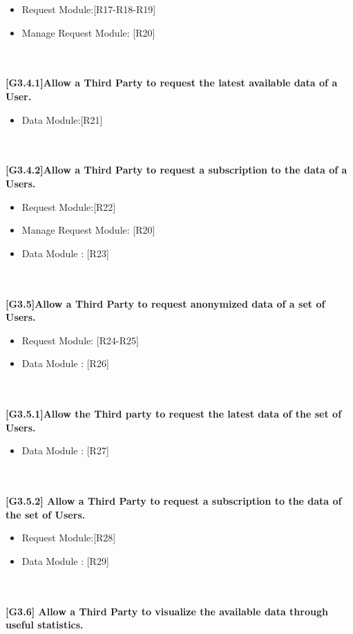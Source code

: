 \begin{itemize}
\item Request Module:[R17-R18-R19]
    \item  Manage Request Module: [R20]
\end{itemize} \\ \\
\textbf{[G3.4.1]Allow a Third Party to request the latest available data of a User.}
\begin{itemize}
\item Data Module:[R21]
   
    \end{itemize} \\ \\
    \textbf{[G3.4.2]Allow a Third Party to request a subscription to the data of a
Users.}
\begin{itemize}
\item Request Module:[R22]
    \item  Manage Request Module: [R20]
    \item Data Module : [R23]
\end{itemize} \\ \\
\textbf{[G3.5]Allow a Third Party to request anonymized data of a set of Users.}
\begin{itemize}
\item Request Module: [R24-R25]
 
    \item Data Module : [R26]
\end{itemize} \\ \\
\textbf{[G3.5.1]Allow the Third party to request the latest data of the set of Users.}
\begin{itemize}
  \item Data Module : [R27]
\end{itemize} \\ \\
\textbf{[G3.5.2] Allow a Third Party to request a subscription to the data of the
set of Users.}
\begin{itemize}
\item Request Module:[R28]
   
    \item Data Module : [R29]
\end{itemize} \\ \\
\textbf{[G3.6] Allow a Third Party to visualize the available data through useful
statistics.}
